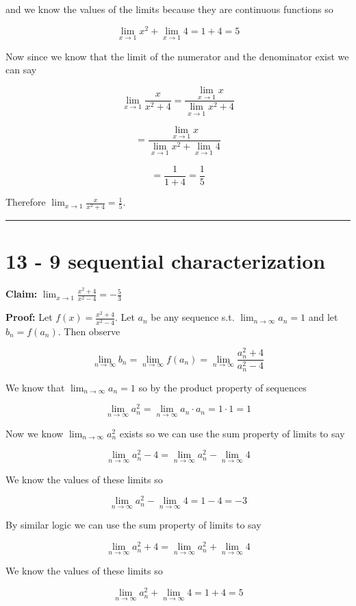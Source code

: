 \documentclass[10pt,letterpaper]{article}
\newcommand\ds{\displaystyle}
\newcommand\qedsym{\hfill \rule{2mm}{2mm}}
\begin{document}
and we know the values of the limits because they are continuous functions so

\[\lim_{x\to 1}x^2 + \lim_{x\to 1} 4 = 1 + 4 = 5\]

Now since we know that the limit of the numerator and the denominator exist we can say

\[\ds\lim_{x\to 1} \frac{x}{x^2 + 4} = \frac{\ds\lim_{x\to 1}x}{\ds\lim_{x\to 1} x^2 + 4}\]

\[= \frac{\ds\lim_{x\to 1}x}{\ds\lim_{x\to 1} x^2 + \ds\lim_{x\to 1}4}\]

\[= \frac{1}{1 + 4} = \frac{1}{5}\]

Therefore $\ds\lim_{x\to 1} \frac{x}{x^2 + 4} = \frac{1}{5}$.

\qedsym

\section*{13 - 9 sequential characterization}

\textbf{Claim:} $\ds\lim_{x\to 1}\frac{x^2+4}{x^2-4} = -\frac{5}{3}$

\medskip

\textbf{Proof:} Let $f(x) = \frac{x^2+4}{x^2-4}$. Let $a_n$ be any sequence s.t. $\ds\lim_{n\to\infty} a_n = 1$ and let $b_n = f(a_n)$. Then observe 

\[\lim_{n\to\infty} b_n = \lim_{n\to\infty} f(a_n) = \lim_{n\to\infty}\frac{a_n^2+4}{a_n^2-4}\]

We know that $\ds\lim_{n\to\infty}a_n = 1$ so by the product property of sequences

\[\lim_{n\to\infty}a_n^2 = \lim_{n\to\infty}a_n\cdot a_n = 1\cdot 1 = 1\]

Now we know $\ds\lim_{n\to\infty}a_n^2$ exists so we can use the sum property of limits to say

\[\lim_{n\to\infty}a_n^2-4 = \lim_{n\to\infty}a_n^2 - \lim_{n\to\infty}4\]

We know the values of these limits so

\[\lim_{n\to\infty}a_n^2 - \lim_{n\to\infty}4 = 1 - 4 = -3\]

By similar logic we can use the sum property of limits to say

\[\lim_{n\to\infty}a_n^2+4 = \lim_{n\to\infty}a_n^2 + \lim_{n\to\infty}4\]

We know the values of these limits so

\[\lim_{n\to\infty}a_n^2 + \lim_{n\to\infty}4 = 1 + 4 = 5\]
\end{document}
